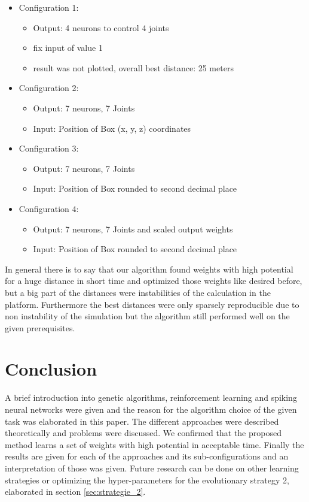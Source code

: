 \begin{itemize}
\item Configuration 1: 
\begin{itemize}
\item Output: 4 neurons to control 4 joints
\item fix input of value 1
\item result was not plotted, overall best distance: 25 meters
\end{itemize}
\item Configuration 2: 
\begin{itemize}
\item Output: 7 neurons, 7 Joints 
\item Input: Position of Box (x, y, z) coordinates
\end{itemize}
\item Configuration 3: 
\begin{itemize}
\item Output: 7 neurons, 7 Joints 
\item Input: Position of Box rounded to second decimal place
\end{itemize}
\item Configuration 4: 
\begin{itemize}
\item Output: 7 neurons, 7 Joints and scaled output weights 
\item Input: Position of Box rounded to second decimal place
\end{itemize}
\end{itemize}


In general there is to say that our algorithm found weights with high potential for a huge distance in short time and optimized those weights like desired before, but a big part of the distances were instabilities of the calculation in the platform. Furthermore the best distances were only sparsely reproducible due to non instability of the simulation but the algorithm still performed well on the given prerequisites. 

\section{Conclusion}

A brief introduction into genetic algorithms, reinforcement learning and spiking neural networks were given and the reason for the algorithm choice of the given task was elaborated in this paper. The different approaches were described theoretically and problems were discussed. We confirmed that the proposed method learns a set of weights with high potential in acceptable time. Finally the results are given for each of the approaches and its sub-configurations and an interpretation of those was given.
Future research can be done on other learning strategies or optimizing the hyper-parameters for the evolutionary strategy 2, elaborated in section \ref{sec:strategie_2}.